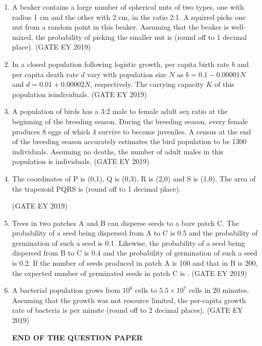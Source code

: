 \documentclass[journal,12pt,onecolumn]{IEEEtran}
\theoremstyle{remark}
\begin{document}
\begin{enumerate}[resume]
\item A beaker contains a large number of spherical nuts of two types, one with radius 1 cm and the other with 2 cm, in the ratio 2:1. A squirrel picks one nut from a random point in this beaker. Assuming that the beaker is well-mixed, the probability of picking the smaller nut is \underline{\hspace{1.5cm}} (round off to 1 decimal place).
\hfill{(GATE EY 2019)}
\item In a closed population following logistic growth, per capita birth rate $b$ and per capita death rate $d$ vary with population size $N$ as $b=0.1-0.00001N$ and $d=0.01+0.00002N$, respectively. The carrying capacity $K$ of this population is\underline{\hspace{1.5cm}}individuals.
\hfill{(GATE EY 2019)}
\item A population of birds has a 3:2 male to female adult sex ratio at the beginning of the breeding season. During the breeding season, every female produces 8 eggs of which 4 survive to become juveniles. A census at the end of the breeding season accurately estimates the bird population to be 1300 individuals. Assuming no deaths, the number of adult males in this population is \underline{\hspace{1.5cm}} individuals.
\hfill{(GATE EY 2019)}
\item The coordinates of P is (0,1), Q is (0,3), R is (2,0) and S is (1,0). The area of the trapezoid PQRS is\underline{\hspace{1.5cm}} (round off to 1 decimal place).

\hfill{(GATE EY 2019)}
\item Trees in two patches A and B can disperse seeds to a bare patch C. The probability of a seed being dispersed from A to C is 0.5 and the probability of germination of such a seed is 0.1. Likewise, the probability of a seed being dispersed from B to C is 0.4 and the probability of germination of such a seed is 0.2. If the number of seeds produced in patch A is 100 and that in B is 200, the expected number of germinated seeds in patch C is \underline{\hspace{1.5cm}}.
\hfill{(GATE EY 2019)}

\item A bacterial population grows from $10^6$ cells to $5.5 \times 10^7$ cells in 20 minutes. Assuming that the growth was not resource limited, the per-capita growth rate of bacteria is \underline{\hspace{1.5cm}}per minute (round off to 2 decimal places).
\hfill{(GATE EY 2019)}

\begin{center}
    \textbf{END OF THE QUESTION PAPER}
\end{center}
\end{enumerate}
\end{document}
